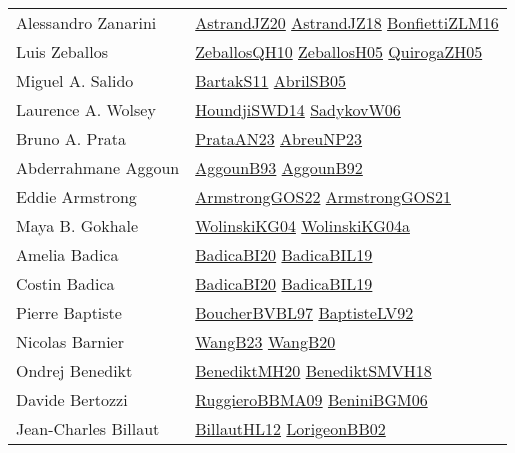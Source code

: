 {\begin{longtable}{p{4cm}p{20cm}}
Alessandro Zanarini & \href{articles/AstrandJZ20.pdf}{AstrandJZ20}\cite{AstrandJZ20} \href{papers/AstrandJZ18.pdf}{AstrandJZ18}\cite{AstrandJZ18} \href{papers/BonfiettiZLM16.pdf}{BonfiettiZLM16}\cite{BonfiettiZLM16} \\
Luis Zeballos & \href{articles/ZeballosQH10.pdf}{ZeballosQH10}\cite{ZeballosQH10} \href{articles/ZeballosH05.pdf}{ZeballosH05}\cite{ZeballosH05} \href{papers/QuirogaZH05.pdf}{QuirogaZH05}\cite{QuirogaZH05} \\
Miguel A. Salido & \href{articles/BartakS11.pdf}{BartakS11}\cite{BartakS11} \href{papers/AbrilSB05.pdf}{AbrilSB05}\cite{AbrilSB05} \\
Laurence A. Wolsey & \href{papers/HoundjiSWD14.pdf}{HoundjiSWD14}\cite{HoundjiSWD14} \href{}{SadykovW06}\cite{SadykovW06} \\
Bruno A. Prata & \href{articles/PrataAN23.pdf}{PrataAN23}\cite{PrataAN23} \href{}{AbreuNP23}\cite{AbreuNP23} \\
Abderrahmane Aggoun & \href{articles/AggounB93.pdf}{AggounB93}\cite{AggounB93} \href{}{AggounB92}\cite{AggounB92} \\
Eddie Armstrong & \href{papers/ArmstrongGOS22.pdf}{ArmstrongGOS22}\cite{ArmstrongGOS22} \href{papers/ArmstrongGOS21.pdf}{ArmstrongGOS21}\cite{ArmstrongGOS21} \\
Maya B. Gokhale & \href{papers/WolinskiKG04.pdf}{WolinskiKG04}\cite{WolinskiKG04} \href{}{WolinskiKG04a}\cite{WolinskiKG04a} \\
Amelia Badica & \href{}{BadicaBI20}\cite{BadicaBI20} \href{papers/BadicaBIL19.pdf}{BadicaBIL19}\cite{BadicaBIL19} \\
Costin Badica & \href{}{BadicaBI20}\cite{BadicaBI20} \href{papers/BadicaBIL19.pdf}{BadicaBIL19}\cite{BadicaBIL19} \\
Pierre Baptiste & \href{}{BoucherBVBL97}\cite{BoucherBVBL97} \href{papers/BaptisteLV92.pdf}{BaptisteLV92}\cite{BaptisteLV92} \\
Nicolas Barnier & \href{papers/WangB23.pdf}{WangB23}\cite{WangB23} \href{papers/WangB20.pdf}{WangB20}\cite{WangB20} \\
Ondrej Benedikt & \href{articles/BenediktMH20.pdf}{BenediktMH20}\cite{BenediktMH20} \href{papers/BenediktSMVH18.pdf}{BenediktSMVH18}\cite{BenediktSMVH18} \\
Davide Bertozzi & \href{articles/RuggieroBBMA09.pdf}{RuggieroBBMA09}\cite{RuggieroBBMA09} \href{papers/BeniniBGM06.pdf}{BeniniBGM06}\cite{BeniniBGM06} \\
Jean{-}Charles Billaut & \href{papers/BillautHL12.pdf}{BillautHL12}\cite{BillautHL12} \href{}{LorigeonBB02}\cite{LorigeonBB02} \\

\end{longtable}}
